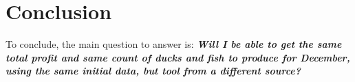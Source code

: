 \documentclass[sigconf, nonacm]{acmart}
\begin{document}
\section{Conclusion}
To conclude, the main question to answer is: \textbf{\textit{Will I be able to get the same total profit and same count of ducks and fish to produce for December, using the same initial data, but tool from a different source?}}





\end{document}
